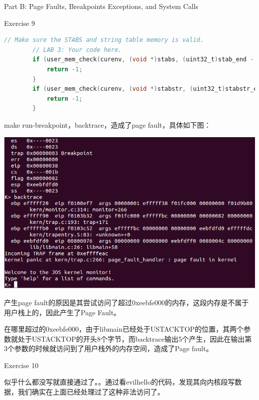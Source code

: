 \documentclass[GBK,winfonts,a4paper,10pt]{ctexart}
\begin{document}
\begin{section}{ Part B: Page Faults, Breakpoints Exceptions, and System Calls }
\begin{subsection}{ Exercise 9 }
\begin{lstlisting}[language=C]
		// Make sure the STABS and string table memory is valid.
		// LAB 3: Your code here.
		if (user_mem_check(curenv, (void *)stabs, (uint32_t)stab_end - (uint32_t)stabs, PTE_U) < 0) {
			return -1;
		}
		if (user_mem_check(curenv, (void *)stabstr, (uint32_t)stabstr_end - (uint32_t)stabstr, PTE_U) < 0) {
			return -1;
		}
\end{lstlisting}
\par
make run-breakpoint，backtrace，造成了page fault，具体如下图：
\par
\includegraphics[scale=0.5]{backtrace.png}
\par
产生page fault的原因是其尝试访问了超过0xeebfe000的内存，这段内存是不属于用户栈上的，因此产生了Page Fault。
\par
在哪里超过的0xeebfe000，由于libmain已经处于USTACKTOP的位置，其两个参数就处于USTACKTOP的开头8个字节，而backtrace输出5个产生，因此在输出第3个参数的时候就访问到了用户栈外的内存空间，造成了Page fault。
\end{subsection}

\begin{subsection}{ Exercise 10 }
\par
似乎什么都没写就直接通过了。。通过看evilhello的代码，发现其向内核段写数据，我们确实在上面已经处理过了这种非法访问了。
\end{subsection}

\end{section}
\end{document}
